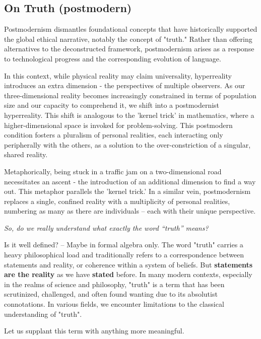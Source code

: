 \documentclass[11pt,a4]{article}
\begin{document}
\subsection{On Truth (postmodern)}
Postmodernism dismantles foundational concepts that have historically supported the global ethical narrative, notably the concept of "truth." Rather than offering alternatives to the deconstructed framework, postmodernism arises as a response to technological progress and the corresponding evolution of language.

In this context, while physical reality may claim universality, hyperreality introduces an extra dimension - the perspectives of multiple observers. As our three-dimensional reality becomes increasingly constrained in terms of population size and our capacity to comprehend it, we shift into a postmodernist hyperreality. This shift is analogous to the 'kernel trick' in mathematics, where a higher-dimensional space is invoked for problem-solving.
This postmodern condition fosters a pluralism of personal realities, each interacting only peripherally with the others, as a solution to the over-constriction of a singular, shared reality.

Metaphorically, being stuck in a traffic jam on a two-dimensional road necessitates an ascent - the introduction of an additional dimension to find a way out. This metaphor parallels the 'kernel trick.' In a similar vein, postmodernism replaces a single, confined reality with a multiplicity of personal realities, numbering as many as there are individuals – each with their unique perspective.


\par
\textit{So, do we really understand what exactly the word “truth” means?} \\
\par
Is it well defined? -- Maybe in formal algebra only. The word "truth" carries a heavy philosophical load and traditionally refers to a correspondence between statements and reality, or coherence within a system of beliefs. But \textbf{statements are the reality} as we have \textbf{stated} before.
In many modern contexts, especially in the realms of science and philosophy, "truth" is a term that has been scrutinized, challenged, and often found wanting due to its absolutist connotations.
In various fields, we encounter limitations to the classical understanding of "truth".


Let us supplant this term with anything more meaningful.
\end{document}
